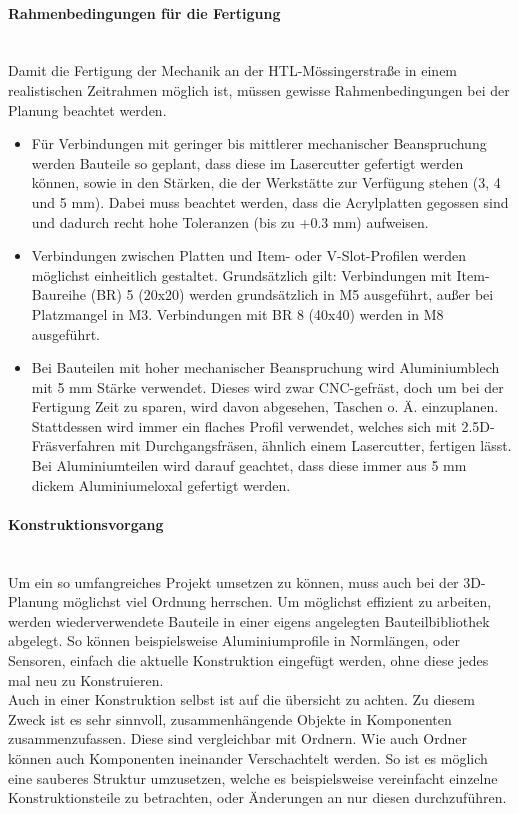 \paragraph{Rahmenbedingungen für die Fertigung}\mbox{}\\
Damit die Fertigung der Mechanik an der HTL-Mössingerstraße in einem realistischen Zeitrahmen möglich ist, müssen gewisse Rahmenbedingungen bei der Planung beachtet werden.
\begin{itemize}
    \item Für Verbindungen mit geringer bis mittlerer mechanischer Beanspruchung werden Bauteile so geplant, dass diese im Lasercutter gefertigt werden können, sowie in den Stärken, die der Werkstätte zur Verfügung stehen (3, 4 und 5 mm). Dabei muss beachtet werden, dass die Acrylplatten gegossen sind und dadurch recht hohe Toleranzen (bis zu +0.3 mm) aufweisen.
    \item Verbindungen zwischen Platten und Item- oder V-Slot-Profilen werden möglichst einheitlich gestaltet. Grundsätzlich gilt: Verbindungen mit Item-Baureihe (BR) 5 (20x20) werden grundsätzlich in M5 ausgeführt, außer bei Platzmangel in M3. Verbindungen mit BR 8 (40x40) werden in M8 ausgeführt.
    \item Bei Bauteilen mit hoher mechanischer Beanspruchung wird Aluminiumblech mit 5 mm Stärke verwendet. Dieses wird zwar CNC-gefräst, doch um bei der Fertigung Zeit zu sparen, wird davon abgesehen, Taschen o. Ä. einzuplanen. Stattdessen wird immer ein flaches Profil verwendet, welches sich mit 2.5D-Fräsverfahren mit Durchgangsfräsen, ähnlich einem Lasercutter, fertigen lässt. Bei Aluminiumteilen wird darauf geachtet, dass diese immer aus 5 mm dickem Aluminiumeloxal gefertigt werden.
\end{itemize}



\paragraph{Konstruktionsvorgang}\mbox{}\\
Um ein so umfangreiches Projekt umsetzen zu können, muss auch bei der 3D-Planung möglichst viel Ordnung herrschen. Um möglichst effizient zu arbeiten, werden wiederverwendete Bauteile in einer eigens angelegten Bauteilbibliothek abgelegt. So können beispielsweise Aluminiumprofile in Normlängen, oder Sensoren, einfach die aktuelle Konstruktion eingefügt werden, ohne diese jedes mal neu zu Konstruieren. \\
Auch in einer Konstruktion selbst ist auf die übersicht zu achten. Zu diesem Zweck ist es sehr sinnvoll, zusammenhängende Objekte in Komponenten zusammenzufassen. Diese sind vergleichbar mit Ordnern. Wie auch Ordner können auch Komponenten ineinander Verschachtelt werden. So ist es möglich eine sauberes Struktur umzusetzen, welche es beispielsweise vereinfacht einzelne Konstruktionsteile zu betrachten, oder Änderungen an nur diesen durchzuführen.

